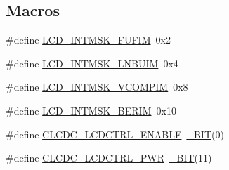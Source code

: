 \subsection*{Macros}
\begin{DoxyCompactItemize}
\item 
\#define \hyperlink{group___l_c_d__18_x_x__43_x_x_gae2537e91c439a06b08c27e63c8639fd8}{L\+C\+D\+\_\+\+I\+N\+T\+M\+S\+K\+\_\+\+F\+U\+F\+IM}~0x2
\item 
\#define \hyperlink{group___l_c_d__18_x_x__43_x_x_gafc1a133f89801ad8c911d73e213d7349}{L\+C\+D\+\_\+\+I\+N\+T\+M\+S\+K\+\_\+\+L\+N\+B\+U\+IM}~0x4
\item 
\#define \hyperlink{group___l_c_d__18_x_x__43_x_x_ga6c78481d9b993bd0247c53e5b182ab49}{L\+C\+D\+\_\+\+I\+N\+T\+M\+S\+K\+\_\+\+V\+C\+O\+M\+P\+IM}~0x8
\item 
\#define \hyperlink{group___l_c_d__18_x_x__43_x_x_ga806f8a96720000a09b6de988d3d46291}{L\+C\+D\+\_\+\+I\+N\+T\+M\+S\+K\+\_\+\+B\+E\+R\+IM}~0x10
\item 
\#define \hyperlink{group___l_c_d__18_x_x__43_x_x_ga1ccec80860d0fac10278a3b13092152b}{C\+L\+C\+D\+C\+\_\+\+L\+C\+D\+C\+T\+R\+L\+\_\+\+E\+N\+A\+B\+LE}~\hyperlink{group___l_p_c___types___public___macros_ga7ee022f5e5a971a8324e4b7572d49170}{\+\_\+\+B\+IT}(0)
\item 
\#define \hyperlink{group___l_c_d__18_x_x__43_x_x_gade9e578fe44d385674e0b9f932bf8bdb}{C\+L\+C\+D\+C\+\_\+\+L\+C\+D\+C\+T\+R\+L\+\_\+\+P\+WR}~\hyperlink{group___l_p_c___types___public___macros_ga7ee022f5e5a971a8324e4b7572d49170}{\+\_\+\+B\+IT}(11)
\end{DoxyCompactItemize}
